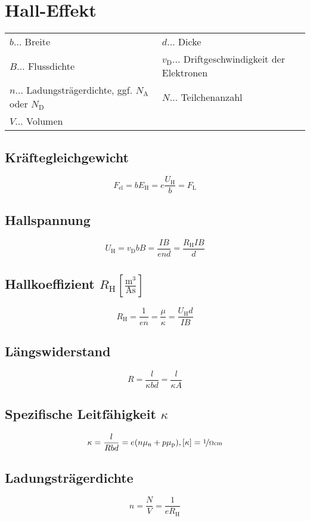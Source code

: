 \chapter{Hall-Effekt}
	\begin{table}[h]
	\begin{tabular}{ll}
	$b\dots$ Breite & $d\dots$ Dicke \\
	$B\dots$ Flussdichte & $v_{\text{D}}\dots$ Driftgeschwindigkeit der Elektronen \\
	$n\dots$ Ladungsträgerdichte, ggf. $N_{\text{A}}$ oder $N_{\text{D}}$ & $N\dots$ Teilchenanzahl\\
	$V\dots$ Volumen\\
	\end{tabular}
	\end{table}

	\section{Kräftegleichgewicht}
		\[
			F_{\text{el}}=bE_{\text{H}}=e\frac{U_{\text{H}}}{b}=F_{\text{L}}
		\]
	
	\section{Hallspannung}
		\[
			U_{\text{H}}=v_{\text{D}}bB=\frac{IB}{end}=\frac{R_{\text{H}}IB}{d}
		\]
	
	\section{Hallkoeffizient $R_{\text{H}}\left[\frac{\text{m}^3}{\text{As}}\right]$}
		\[
			R_{\text{H}}=\frac{1}{en}=\frac{\mu}{\kappa}=\frac{U_{\text{H}}d}{IB}
		\]

	\section{Längswiderstand}
		\[
			R=\frac{l}{\kappa bd}=\frac{l}{\kappa A}
		\]

	\section{Spezifische Leitfähigkeit $\kappa$}
		\[
			\kappa=\frac{l}{Rbd}=e(n\mu_{\text{n}}+p\mu_{\text{p}}), [\kappa]=\nicefrac{1}{\Omega\text{cm}}
		\]
	
	\section{Ladungsträgerdichte}
		\[
			n=\frac{N}{V}=\frac{1}{eR_{\text{H}}}
		\]
	
